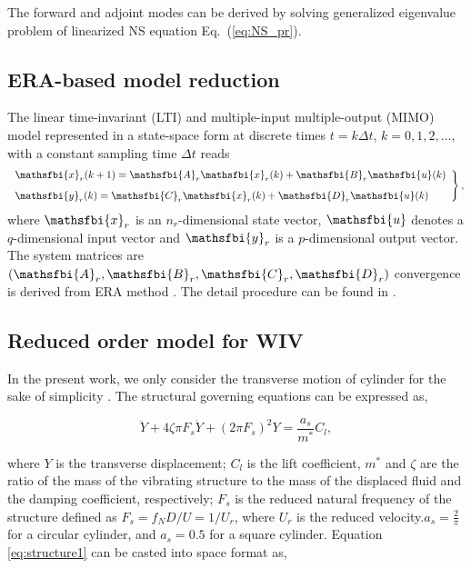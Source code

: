 The forward and adjoint modes can be derived by solving generalized eigenvalue problem of linearized NS equation
Eq.~(\ref{eq:NS_pr}). 
%
\subsection{ERA-based model reduction}
The linear time-invariant (LTI) and multiple-input multiple-output (MIMO) model represented in a state-space form 
at discrete times $t=k\Delta t$, 
$k=0,1,2,...,$ with a constant sampling time $\Delta t$ reads 
\begin{equation}
\left. \begin{array}{ll}

\displaystyle \mathsfbi{x}_{r}(k+1)=\mathsfbi{A}_{r}\mathsfbi{x}_{r}(k)+\mathsfbi{B}_{r}\mathsfbi{u}(k)  \\[8pt]

\displaystyle \mathsfbi{y}_{r}(k)=\mathsfbi{C}_{r}\mathsfbi{x}_{r}(k)+\mathsfbi{D}_{r}\mathsfbi{u}(k) 
\end{array}\right\},
 \label{eq:ERA_ROM}
\end{equation}  
where $\mathsfbi{x}_r$ is an $n_r$-dimensional state vector, 
$\mathsfbi{u}$ denotes a $q$-dimensional input vector 
and $\mathsfbi{y}_r$ is a $p$-dimensional output vector.  
The system matrices are $\left(\mathsfbi{A}_r,\mathsfbi{B}_r,\mathsfbi{C}_r,\mathsfbi{D}_r\right)$
convergence is derived from ERA method \cite{Juang1985}. 
The detail procedure can be found in \cite{yao_jfm_1}. 


\subsection{Reduced order model for WIV}

In the present work, we only consider the transverse motion of cylinder for the sake of simplicity \cite{yao_jfm_1}.
The structural governing equations can be expressed as,
 
\begin{equation}
{\ddot{Y} + 4\zeta\pi F_{s}\dot{Y} + (2\pi F_{s})^2 Y}=\frac{a_{s}}{m^{*}} C_{l},
\label{eq:structure1}
\end{equation}

where $Y$ is the transverse displacement; $C_{l}$ is the lift coefficient, 
$m^{*}$ and $\zeta$ are the ratio of the mass of the vibrating structure to the mass of the displaced fluid and the 
damping coefficient, respectively; $F_{s}$ is the reduced natural frequency of the structure 
defined as $F_{s}=f_{N}D/U = 1/U_r$, where $U_r$ is the reduced velocity.$a_{s}=\frac{2}{\pi}$ for a circular cylinder, 
and  $a_{s}=0.5$ for a square cylinder.
Equation \eqref{eq:structure1} can be casted into space format as, 


